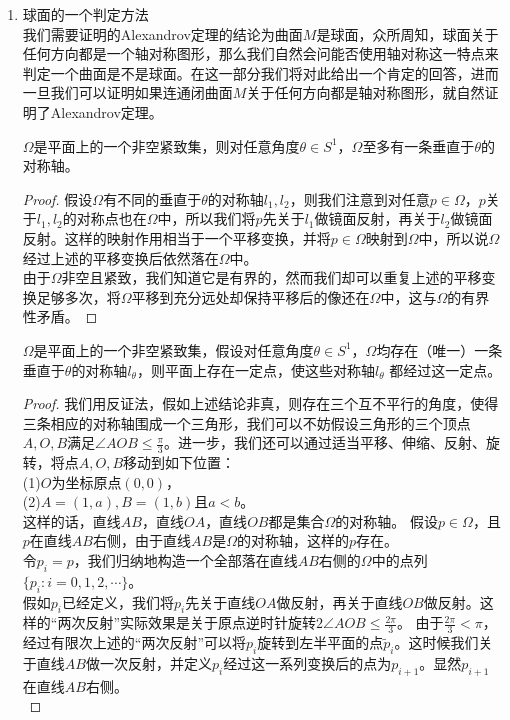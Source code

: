 \begin{enumerate}
\item 球面的一个判定方法\\
我们需要证明的Alexandrov定理的结论为曲面$M$是球面，众所周知，球面关于任何方向都是一个轴对称图形，那么我们自然会问能否使用轴对称这一特点来判定一个曲面是不是球面。在这一部分我们将对此给出一个肯定的回答，进而一旦我们可以证明如果连通闭曲面$M$关于任何方向都是轴对称图形，就自然证明了Alexandrov定理。
\begin{lemma}
$\Omega$是平面上的一个非空紧致集，则对任意角度$\theta\in S^{1}$，$\Omega$至多有一条垂直于$\theta$的对称轴。
\end{lemma}
\begin{proof}
假设$\Omega$有不同的垂直于$\theta$的对称轴$l_{1},l_{2}$，则我们注意到对任意$p\in\Omega$，$p$关于$l_{1},l_{2}$的对称点也在$\Omega$中，所以我们将$p$先关于$l_{1}$做镜面反射，再关于$l_{2}$做镜面反射。这样的映射作用相当于一个平移变换，并将$p\in\Omega$映射到$\Omega$中，所以说$\Omega$经过上述的平移变换后依然落在$\Omega$中。\\
由于$\Omega$非空且紧致，我们知道它是有界的，然而我们却可以重复上述的平移变换足够多次，将$\Omega$平移到充分远处却保持平移后的像还在$\Omega$中，这与$\Omega$的有界性矛盾。
\end{proof}
\begin{theorem}
$\Omega$是平面上的一个非空紧致集，假设对任意角度$\theta\in S^{1}$，$\Omega$均存在（唯一）一条垂直于$\theta$的对称轴$l_{\theta}$，则平面上存在一定点，使这些对称轴$l_{\theta}$ 都经过这一定点。
\end{theorem}
\begin{proof}
我们用反证法，假如上述结论非真，则存在三个互不平行的角度，使得三条相应的对称轴围成一个三角形，我们可以不妨假设三角形的三个顶点$A,O,B$满足$\angle AOB \leq \frac{\pi}{3}$。进一步，我们还可以通过适当平移、伸缩、反射、旋转，将点$A,O,B$移动到如下位置：\\
(1)$O$为坐标原点$(0,0)$，\\
(2)$A=(1,a),B=(1,b)$且$a<b$。\\
这样的话，直线$AB$，直线$OA$，直线$OB$都是集合$\Omega$的对称轴。
假设$p\in\Omega$，且$p$在直线$AB$右侧，由于直线$AB$是$\Omega$的对称轴，这样的$p$存在。\\
令$p_{i}=p$，我们归纳地构造一个全部落在直线$AB$右侧的$\Omega$中的点列$\{p_{i}:i=0,1,2,\cdots\}$。\\
假如$p_{i}$已经定义，我们将$p_{i}$先关于直线$OA$做反射，再关于直线$OB$做反射。这样的“两次反射”实际效果是关于原点逆时针旋转$2\angle AOB \leq \frac{2\pi}{3}$。 由于$\frac{2\pi}{3}<\pi$，经过有限次上述的“两次反射”可以将$p_{i}$旋转到左半平面的点$\widetilde{p}_{i}$。这时候我们关于直线$AB$做一次反射，并定义$p_{i}$经过这一系列变换后的点为$p_{i+1}$。显然$p_{i+1}$在直线$AB$右侧。\\

\end{proof}
\end{enumerate}
